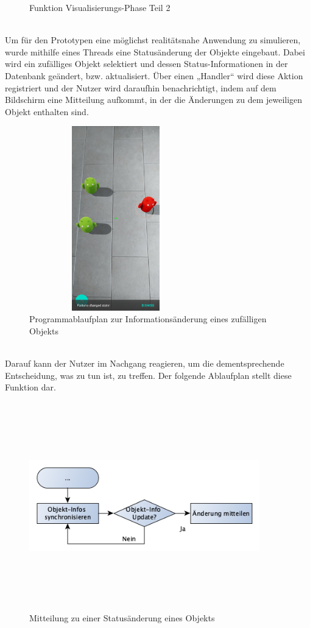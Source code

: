 \begin{figure}[hbt!]
    \caption{Funktion Visualisierungs-Phase Teil 2}
    \label{pic:showdatatoobj}
\end{figure}
\\
Um für den Prototypen eine möglichst realitätsnahe Anwendung zu simulieren, wurde mithilfe eines Threads eine Statusänderung der Objekte eingebaut. Dabei wird 
ein zufälliges Objekt selektiert und dessen Status-Informationen in der Datenbank geändert, bzw. aktualisiert. Über einen „Handler“ wird diese Aktion registriert 
und der Nutzer wird daraufhin benachrichtigt, indem auf dem Bildschirm eine Mitteilung aufkommt, in der die Änderungen zu dem jeweiligen Objekt 
enthalten sind. 
\begin{figure}[hbt!]
    \centering
    \includegraphics[width=7.5cm,height=8cm,keepaspectratio]{4Umsetzung/Bilder/changeState.jpeg}
    \caption{Programmablaufplan zur Informationsänderung eines zufälligen Objekts}
    \label{pic:startmenu}
\end{figure}
\\
Darauf kann der Nutzer im Nachgang reagieren, um die dementsprechende Entscheidung, was zu tun ist, zu treffen. Der folgende Ablaufplan stellt 
diese Funktion dar.
\begin{figure}[hbt!]
    \centering
    \includegraphics[width=10cm,height=9cm,keepaspectratio]{4Umsetzung/Bilder/changeInfoPAP.png}
    \caption{Mitteilung zu einer Statusänderung eines Objekts}
    \label{pic:startmenu}
\end{figure}
